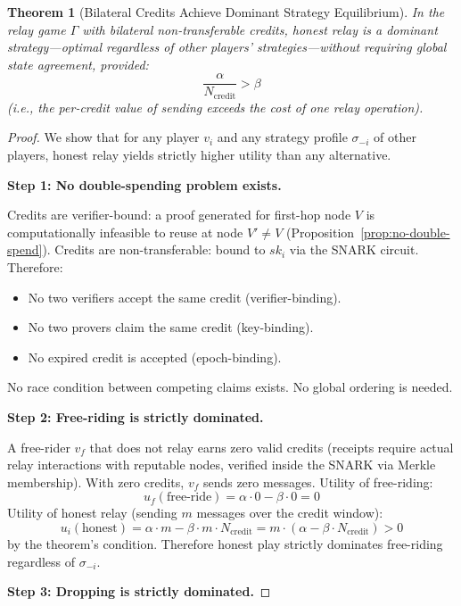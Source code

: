 \documentclass[11pt,a4paper]{article}
\newtheorem{theorem}{Theorem}
\begin{document}
\begin{theorem}[Bilateral Credits Achieve Dominant Strategy Equilibrium]
\label{thm:bilateral}
In the relay game $\Gamma$ with bilateral non-transferable credits, honest relay is a \emph{dominant strategy}---optimal regardless of other players' strategies---without requiring global state agreement, provided:
\begin{equation}
    \frac{\alpha}{N_{\text{credit}}} > \beta
\end{equation}
(i.e., the per-credit value of sending exceeds the cost of one relay operation).
\end{theorem}

\begin{proof}
We show that for any player $v_i$ and any strategy profile $\sigma_{-i}$ of other players, honest relay yields strictly higher utility than any alternative.

\textbf{Step 1: No double-spending problem exists.}

Credits are verifier-bound: a proof generated for first-hop node $V$ is computationally infeasible to reuse at node $V' \neq V$ (Proposition~\ref{prop:no-double-spend}). Credits are non-transferable: bound to $sk_i$ via the SNARK circuit. Therefore:
\begin{itemize}[nosep]
    \item No two verifiers accept the same credit (verifier-binding).
    \item No two provers claim the same credit (key-binding).
    \item No expired credit is accepted (epoch-binding).
\end{itemize}
No race condition between competing claims exists. No global ordering is needed.

\textbf{Step 2: Free-riding is strictly dominated.}

A free-rider $v_f$ that does not relay earns zero valid credits (receipts require actual relay interactions with reputable nodes, verified inside the SNARK via Merkle membership). With zero credits, $v_f$ sends zero messages. Utility of free-riding:
\[
u_f(\text{free-ride}) = \alpha \cdot 0 - \beta \cdot 0 = 0
\]
Utility of honest relay (sending $m$ messages over the credit window):
\[
u_i(\text{honest}) = \alpha \cdot m - \beta \cdot m \cdot N_{\text{credit}} = m \cdot (\alpha - \beta \cdot N_{\text{credit}}) > 0
\]
by the theorem's condition. Therefore honest play strictly dominates free-riding regardless of $\sigma_{-i}$.

\textbf{Step 3: Dropping is strictly dominated.}


\end{proof}
\end{document}
